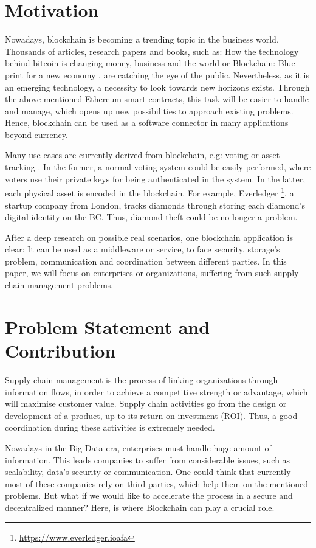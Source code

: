\section{Motivation}

Nowadays, blockchain is becoming a trending topic in the business world. Thousands of articles, research papers and books, such as: How the technology behind bitcoin is changing money, business and the world \cite{tapscott2016blockchain} or Blockchain: Blue print for a new economy \cite{swan2015blockchain}, are catching the eye of the public. Nevertheless, as it is an emerging technology, a necessity to look towards new horizons exists. Through the above mentioned Ethereum smart contracts, this task will be easier to handle and manage, which opens up new possibilities to approach existing problems. Hence, blockchain can be used as a software connector in many applications beyond currency.

Many use cases are currently derived from blockchain, e.g: voting or asset tracking \cite{abeyratne2016blockchain}. In the former, a normal voting system could be easily performed, where voters use their private keys for being authenticated in the system. In the latter,  each physical asset is encoded in the blockchain. For example, Everledger \footnote{\url{https://www.everledger.ioafa}}, a startup company from London, tracks diamonds through storing each diamond's digital identity on the BC. Thus, diamond theft could be no longer a problem.

After a deep research on possible real scenarios, one blockchain application is clear: It can be used as a middleware or service, to face security, storage's problem, communication and coordination between different parties. In this paper, we will focus on enterprises or organizations, suffering from such supply chain management problems.

\section{Problem Statement and Contribution}

Supply chain management is the process of linking organizations through information flows, in order to achieve a competitive strength or advantage, which will maximise customer value. Supply chain activities go from the design or development of a product, up to its return on investment (ROI). Thus, a good coordination during these activities is extremely needed.

Nowadays in the Big Data era, enterprises must handle huge amount of information. This leads companies to suffer from considerable issues, such as scalability, data's security or communication. One could think that currently most of these companies rely on third parties, which help them on the mentioned problems. But what if we would like to accelerate the process in a secure and decentralized manner? Here, is where Blockchain can play a crucial role.

